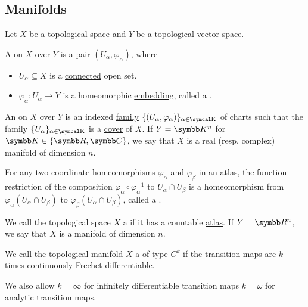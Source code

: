 \subsection{Manifolds}\label{subsec:manifolds}

\begin{definition}\label{def:atlas}
  Let \( X \) be a \hyperref[def:topological_space]{topological space} and \( Y \) be a \hyperref[def:topological_vector_space]{topological vector space}.

  A  on \( X \) over \( Y \) is a pair \( (U_\alpha, \varphi_\alpha) \), where
  \begin{itemize}
    \item \( U_\alpha \subseteq X \) is a \hyperref[def:connected_space]{connected} open set.
    \item \( \varphi_\alpha: U_\alpha \to Y \) is a homeomorphic \hyperref[def:homeomorphism]{embedding}, called a .
  \end{itemize}

  An  on \( X \) over \( Y \) is an indexed \hyperref[def:indexed_family]{family} \( \{ (U_\alpha, \varphi_\alpha) \}_{\alpha \in \CK} \) of charts such that the family \( \{ U_\alpha \}_{\alpha \in \CK} \) is a \hyperref[def:set_partition]{cover} of \( X \). If \( Y = \BK^n \) for \( \BK \in \{ \BR, \BC \} \), we say that \( X \) is a real (resp. complex) manifold of dimension \( n \).

  For any two coordinate homeomorphisms \( \varphi_\alpha \) and \( \varphi_\beta \) in an atlas, the function restriction of the composition \( \varphi_\alpha \circ \varphi_\alpha^{-1} \) to \( U_\alpha \cap U_\beta \) is a homeomorphism from \( \varphi_\alpha(U_\alpha \cap U_\beta) \) to \( \varphi_\beta(U_\alpha \cap U_\beta) \), called a .
\end{definition}

\begin{definition}\label{def:topological_manifold}
  We call the topological space \( X \) a  if it has a countable \hyperref[def:atlas]{atlas}. If \( Y = \BR^n \), we say that \( X \) is a manifold of dimension \( n \).
\end{definition}

\begin{definition}\label{def:differentiable_manifold}
  We call the \hyperref[def:topological_manifold]{topological manifold} \( X \) a  of type \( C^k \) if the transition maps are \( k \)-times continuously \hyperref[def:differentiability/frechet]{Frechet} differentiable.

  We also allow \( k = \infty \) for infinitely differentiable transition maps \( k = \omega \) for analytic transition maps.
\end{definition}

